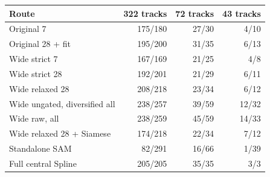 \begin{tabular}{lrrr}
\toprule
Route & 322 tracks & 72 tracks & 43 tracks \\
\midrule
Original 7 & 175/180 & 27/30 & 4/10 \\
Original 28 + fit & 195/200 & 31/35 & 6/13 \\
Wide strict 7 & 167/169 & 21/25 & 4/8 \\
Wide strict 28 & 192/201 & 21/29 & 6/11 \\
Wide relaxed 28 & 208/218 & 23/34 & 6/12 \\
Wide ungated, diversified all & 238/257 & 39/59 & 12/32 \\
Wide raw, all & 238/259 & 45/59 & 14/33 \\
Wide relaxed 28 + Siamese & 174/218 & 22/34 & 7/12 \\
Standalone SAM & 82/291 & 16/66 & 1/39 \\
Full central Spline & 205/205 & 35/35 & 3/3 \\
\bottomrule
\end{tabular}
